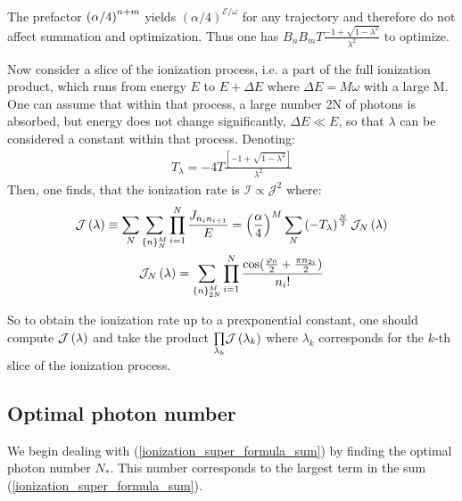 The prefactor $  \left(\alpha/4\right)^{n+m} $ yields $ (\alpha/4)^{\mathcal{E}/\omega} $ for any trajectory and therefore do not affect summation and optimization. Thus one has $ B_{n}B_{m}T\frac{-1+\sqrt{1-\lambda^{2}}}{\lambda^{2}} $ to optimize.

Now consider a slice of the ionization process, i.e. a part of the full ionization product, which runs from energy $ E $ to $ E+\Delta E $ where $ \Delta E=M\omega $ with a large M. One can assume that within that process, a large number 2N of photons is absorbed, but energy does not change significantly, $ \Delta E\ll E $, so that $ \lambda $ can be considered a constant within that process. Denoting:
\begin{gather}
	T_{\lambda}=-4T\frac{\left[-1+\sqrt{1-\lambda^{2}}\right]}{\lambda^{2}}
\end{gather}
Then, one finds, that the ionization rate is $ \mathcal{I}\propto\mathcal{J}^2 $ where:
\begin{gather}
\label{ionization_super_formula_sum}
\mathcal{J}\left(\lambda\right)
\equiv
\sum_N
\sum_{\{n\}_{N}^{M}}\prod_{i=1}^{N}\frac{J_{n_{i}n_{i+1}}}{E}
=
\left(\frac{\alpha}{4}\right)^{M}
\sum_N
\left(-T_{\lambda}\right)^{\frac{N}{2}}
\mathcal{J}_N\left(\lambda\right)
\\
\label{ionization_super_formula}
\mathcal{J}_N\left(\lambda\right)
=
\sum_{\{n\}_{2N}^{M}}\prod_{i=1}^{N}\frac{\cos(\frac{\varphi_{0}}{2}+\frac{\pi n_{2i}}{2})}{n_{i}!}
\end{gather}

So to obtain the ionization rate up to a prexponential constant, one should compute $ \mathcal{J}\left(\lambda\right) $ and take the product 
$ \underset{\lambda_k}{\prod} \mathcal{J}\left(\lambda_k\right)$ where $ \lambda_k $ corresponds for the $ k $-th slice of the ionization process. 
\subsection{Optimal photon number}
We begin dealing with (\ref{ionization_super_formula_sum}) by finding the optimal photon number $ N_* $. This number corresponds to the largest term in the sum (\ref{ionization_super_formula_sum}).

